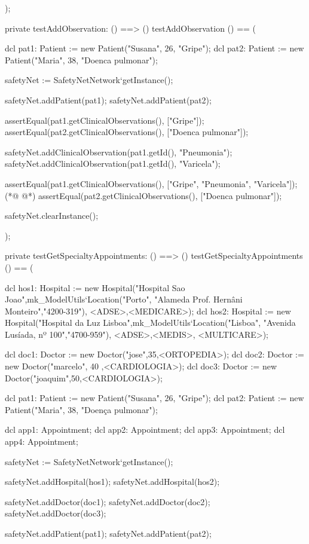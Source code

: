 \begin{vdmpp}[breaklines=true]
);


private testAddObservation: () ==> ()
 testAddObservation () == (
  
  dcl pat1: Patient := new Patient("Susana", 26, "Gripe");
  dcl pat2: Patient := new Patient("Maria", 38, "Doenca pulmonar");
  
  safetyNet := SafetyNetNetwork`getInstance();
   
  safetyNet.addPatient(pat1);
  safetyNet.addPatient(pat2);

  assertEqual(pat1.getClinicalObservations(), ["Gripe"]);
  assertEqual(pat2.getClinicalObservations(), ["Doenca pulmonar"]);
  
  safetyNet.addClinicalObservation(pat1.getId(), "Pneumonia");
  safetyNet.addClinicalObservation(pat1.getId(), "Varicela");

  assertEqual(pat1.getClinicalObservations(), ["Gripe", "Pneumonia", "Varicela"]);
(*@
\label{testGetHospitalClosestAvailableDate:904}
@*)
  assertEqual(pat2.getClinicalObservations(), ["Doenca pulmonar"]); 
   
  safetyNet.clearInstance();
    
);


private testGetSpecialtyAppointments: () ==> ()
 testGetSpecialtyAppointments () == (
 
  dcl hos1: Hospital := new Hospital("Hospital Sao Joao",mk_ModelUtils`Location("Porto", "Alameda Prof. Hernâni Monteiro","4200-319"), {<ADSE>,<MEDICARE>});
  dcl hos2: Hospital := new Hospital("Hospital da Luz Lisboa",mk_ModelUtils`Location("Lisboa", "Avenida Lusíada, nº 100","4700-959"), {<ADSE>,<MEDIS>, <MULTICARE>});
  
  dcl doc1: Doctor := new Doctor("jose",35,<ORTOPEDIA>);
  dcl doc2: Doctor := new Doctor("marcelo", 40 ,<CARDIOLOGIA>);
  dcl doc3: Doctor := new Doctor("joaquim",50,<CARDIOLOGIA>);
  
  dcl pat1: Patient := new Patient("Susana", 26, "Gripe");
  dcl pat2: Patient := new Patient("Maria", 38, "Doença pulmonar");
  
  dcl app1: Appointment;
  dcl app2: Appointment;
  dcl app3: Appointment;
  dcl app4: Appointment;
  
  safetyNet := SafetyNetNetwork`getInstance();
   
  safetyNet.addHospital(hos1);
  safetyNet.addHospital(hos2);
  
  safetyNet.addDoctor(doc1);
  safetyNet.addDoctor(doc2);
  safetyNet.addDoctor(doc3);
  
  safetyNet.addPatient(pat1);
  safetyNet.addPatient(pat2);


\end{vdmpp}
